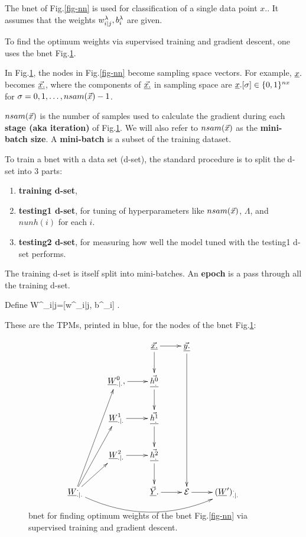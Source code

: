The bnet of Fig.\ref{fig-nn}
is used for classification
of a single data point $x.$.
It assumes that the
weights $w^\lambda_{i|j}, b_i^\lambda$
are given.

To find the optimum
weights via supervised
training and gradient descent,
one uses the bnet Fig.\ref{fig-nn-ext}.

In Fig.\ref{fig-nn-ext},
the nodes in
Fig.\ref{fig-nn} become 
sampling space vectors.
For example, ${\underline{x}}.$ becomes
$\underline{\vec{x.}}$, where the
components of 
$\underline{\vec{x.}}$ in sampling space are
${\underline{x}}.[\sigma]\in \{0,1\}^{nx}$
for $\sigma=0, 1, \ldots, nsam({\vec{x}})-1$.


$nsam({\vec{x}})$
is the number of
samples used to calculate the
gradient
during each {\bf stage (aka iteration)} of
Fig.\ref{fig-nn-ext}.
We will also  refer to
$nsam({\vec{x}})$ as the {\bf mini-batch size}.
A {\bf mini-batch} is a subset 
of the training dataset.



To train a bnet with a data
set (d-set),
the standard procedure
is to split the d-set into 3 parts:
\begin{enumerate}
\item
{\bf training d-set}, 
\item
{\bf testing1 d-set}, for
tuning
of hyperparameters 
like $nsam({\vec{x}})$,  $\Lambda$,
and $nunh(i)$
for each $i$. 
\item
{\bf testing2 d-set}, for measuring
how well the model
tuned with the testing1 d-set
performs.
\end{enumerate}

The training d-set is 
itself split into mini-batches.
An {\bf epoch} is a pass through all 
the training d-set.

Define
\beq
W^\lam_{i|j}=[w^\lam_{i|j}, b^\lam_i]
\;.
\eeq

These are the
TPMs,
printed in blue, for 
the nodes of the bnet 
Fig.\ref{fig-nn-ext}:

\begin{figure}[h!]
\centering
$$\xymatrix{
&&\ranvec{x.}\ar[d]\ar[r]&
\ranvec{y.}\ar[dddd]\\
&\rvW^0_{.|.}, \ar[r]&
\ranvec{h^0_.}\ar[d]\\
&\rvW^1_{.|.}\ar[r]&
\ranvec{h^1_.}\ar[d]\\
&\rvW^2_{.|.}\ar[r]&
\ranvec{h^2_.}\ar[d]\\
\rvW^._{.|.}\ar[ru]\ar[ruu]\ar[ruuu]
\ar@/_2pc/[rrrr]
&&
\vec{\rvY}.\ar[r]&\cale\ar[r]&
(\rvW')^._{.|.}
}$$
\caption{bnet 
for 
finding optimum
weights of the bnet 
Fig.\ref{fig-nn} via
supervised training
and gradient descent.
}
\label{fig-nn-ext}
\end{figure}

